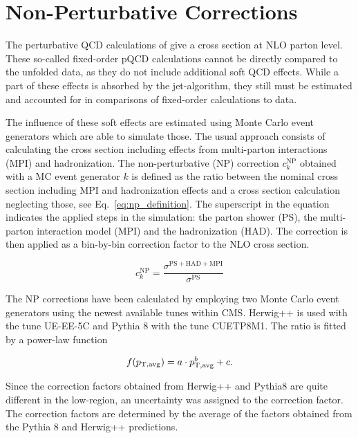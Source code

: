 
\section{Non-Perturbative Corrections}
\label{sec:np_factors}

The perturbative QCD calculations of \NLOJETPP give a cross section at NLO
parton level. These so-called fixed-order pQCD calculations cannot be directly
compared to the unfolded data, as they do not include additional soft QCD
effects. While a part of these effects is absorbed by the jet-algorithm,
they still must be estimated and accounted for in comparisons of fixed-order
calculations to data.

The influence of these soft effects are estimated using Monte Carlo event
generators which are able to simulate those. The usual approach consists of
calculating the cross section including effects from multi-parton interactions
(MPI) and hadronization. The non-perturbative (NP) correction $c_k^\mathrm{NP}$
obtained with a MC event generator $k$ is defined as the ratio between the
nominal cross section including MPI and hadronization effects and a cross section calculation
neglecting those, see Eq.~\ref{eq:np_definition}. The superscript in the
equation indicates the applied steps in the simulation: the parton shower (PS),
the multi-parton interaction model (MPI) and the hadronization (HAD). The
correction is then applied as a bin-by-bin correction factor to the NLO cross
section.

\begin{equation*}
    c_{k}^{\mathrm{NP}} = \frac{\sigma^{\mathrm{PS+HAD+MPI}}}{\sigma^{\mathrm{PS}}}
    \label{eq:np_definition}
\end{equation*}

The NP corrections have been calculated by employing two Monte Carlo
event generators using the newest available tunes within CMS. Herwig++ is used
with the tune UE-EE-5C and Pythia 8 with the tune CUETP8M1. The ratio is fitted
by a power-law function

\begin{equation*}
  f(p_{\mathrm{T,avg}}) = a \cdot p_{\mathrm{T,avg}}^b + c.
  \label{fcn:np_fit}
\end{equation*}

Since the correction factors obtained from Herwig++ and Pythia8 are quite
different in the low-\pt region, an uncertainty was assigned to the correction
factor. The correction factors are determined by the average of the factors
obtained from the Pythia 8 and Herwig++ predictions.

